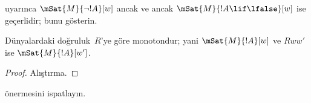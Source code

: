 \documentclass[../../../include/open-logic-section]{subfiles}
\begin{document}
\begin{prob}
   uyarınca
  $\mSat{M}{\lnot !A}[w]$ ancak ve ancak $\mSat{M}{!A \lif \lfalse}[w]$ ise
  geçerlidir; bunu gösterin.
\end{prob}

\begin{prop}
  Dünyalardaki doğruluk~$R$'ye göre monotondur; yani
  $\mSat{M}{!A}[w]$ ve $Rww'$ ise $\mSat{M}{!A}[w']$.
\end{prop}

\begin{proof}
  Alıştırma.
\end{proof}

\begin{prob}
   önermesini ispatlayın.
\end{prob}
\end{document}
